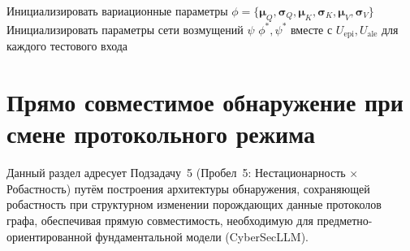 \begin{algorithm}[htbp]
\caption{Стохастический трансформер: вариационное байесовское обучение с состязательной робастностью}\label{alg:stoch_trans}
Инициализировать вариационные параметры $\phi = \{\bm{\mu}_Q,\bm{\sigma}_Q,\bm{\mu}_K,\bm{\sigma}_K,\bm{\mu}_V,\bm{\sigma}_V\}$\;
Инициализировать параметры сети возмущений $\psi$\;
\Return $\phi^*,\psi^*$ вместе с $U_{\mathrm{epi}},U_{\mathrm{ale}}$ для каждого тестового входа
\end{algorithm}


\section{Прямо совместимое обнаружение при смене протокольного режима}
\label{sec:pq_idps}

Данный раздел адресует Подзадачу~5 (Пробел~5: Нестационарность $\times$ Робастность) путём построения архитектуры обнаружения, сохраняющей робастность при структурном изменении порождающих данные протоколов графа, обеспечивая прямую совместимость, необходимую для предметно-ориентированной фундаментальной модели (CyberSecLLM).

